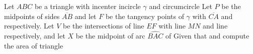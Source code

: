 Let $ABC$ be a triangle with incenter  incircle $\gamma$ and circumcircle  Let   $P$ be the midpoints of sides   $\overline{AB}$ and let  $F$ be the tangency points of $\gamma$ with $\overline{CA}$ and  respectively. Let  $V$ be the intersections of line $EF$ with line $MN$ and line  respectively, and let $X$ be the midpoint of arc $\widehat{BAC}$ of 
Given that   and  compute the area of triangle 